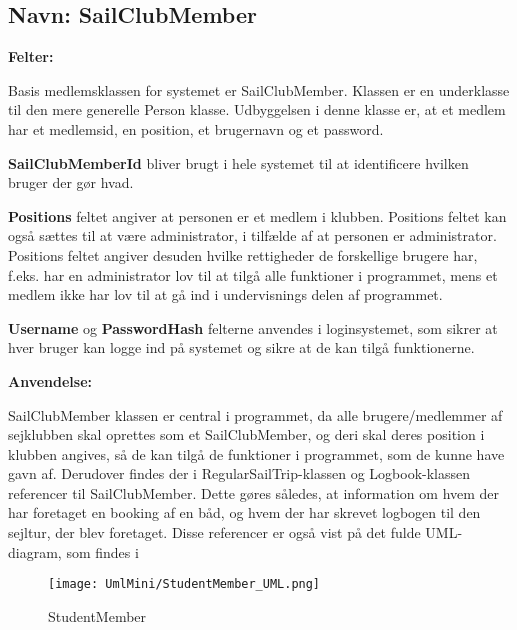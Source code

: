 \subsection*{Navn: SailClubMember}

\textbf{Felter:}

Basis medlemsklassen for systemet er SailClubMember. 
Klassen er en underklasse til den mere generelle Person klasse. 
Udbyggelsen i denne klasse er, at et medlem har et medlemsid, en position, et brugernavn og et password.

\textbf{SailClubMemberId} bliver brugt i hele systemet til at identificere hvilken bruger der gør hvad. 

\textbf{Positions} feltet angiver at personen er et medlem i klubben. 
Positions feltet kan også sættes til at være administrator, i tilfælde af at personen er administrator. 
Positions feltet angiver desuden hvilke rettigheder de forskellige brugere har, f.eks. har en administrator lov til at tilgå alle funktioner i programmet, mens et medlem  ikke har lov til at gå ind i undervisnings delen af programmet.

\textbf{Username} og \textbf{PasswordHash} felterne anvendes i loginsystemet, som sikrer at hver bruger kan logge ind på systemet og sikre at de kan tilgå funktionerne.

\textbf{Anvendelse:}

SailClubMember klassen er central i programmet, da alle brugere/medlemmer af sejklubben skal oprettes som et SailClubMember, og deri skal deres position i klubben angives, så de kan tilgå de funktioner i programmet, som de kunne have gavn af. Derudover findes der i RegularSailTrip-klassen og Logbook-klassen referencer til SailClubMember. Dette gøres således, at information om hvem der har foretaget en booking af en båd, og hvem der har skrevet logbogen til den sejltur, der blev foretaget. Disse referencer er også vist på det fulde UML-diagram, som findes i 

\begin{wrapfigure}[10]{R}{0.5\textwidth}
    \label{img:StudentMember}
    \vspace{-30pt}
    \begin{center}
        \texttt{[image: UmlMini/StudentMember\_UML.png]}
    \end{center}
    \vspace{-20pt}
    \caption{StudentMember}
\end{wrapfigure}

